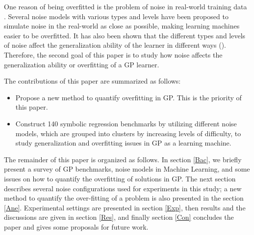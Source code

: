 One reason of being overfitted is the problem of noise in real-world training data \cite{1999Liu}. Several noise models with various types and levels have been proposed to simulate noise in the real-world as close as possible, making learning machines easier to be overfitted. It has also been shown that the different types and levels of noise affect the generalization ability of the learner in different ways (\cite{1994Mark}\cite{1996Hic}\cite{2003Eli}\cite{1999Carla}\cite{2007Daz}\cite{2010Dav}\cite{2011Nic}\cite{2012Loh}\cite{2014Fré})\cite{silva2017semi}\cite{gonccalves2017exploration}. Therefore, the second goal of this paper is to study how noise affects the generalization ability or overfitting of a GP learner. 

The contributions of this paper are summarized as follows:
\begin{itemize}
\item Propose a new method to quantify overfitting in GP. This is the priority of this paper. %
\item Construct 140 symbolic regression benchmarks by utilizing different noise models, which are grouped into clusters by increasing levels of difficulty, to study generalization and overfitting issues in GP as a learning machine.
\end{itemize} \par

The remainder of this paper is organized as follows. In section \ref{Bac}, we briefly present a survey of GP benchmarks, noise models in Machine Learning, and some issues on how to quantify the overfitting of solutions in GP.  The next section describes several noise configurations used for experiments in this study; a new method to quantify the over-fitting of a problem is also presented in the section \ref{Ane}. Experimental settings are presented in section \ref{Exp}, then results and the discussions are given in section \ref{Res}, and finally section \ref{Con} concludes the paper and gives some proposals for future work.
